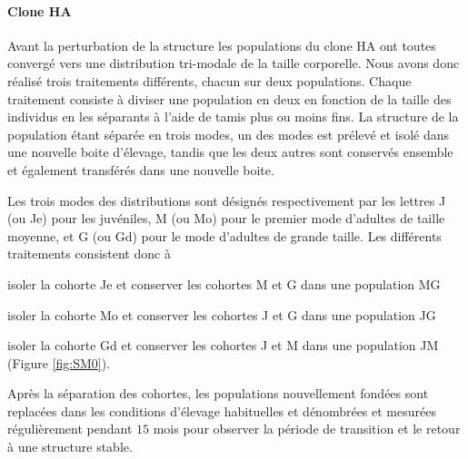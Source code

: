 \paragraph{Clone HA} Avant la perturbation de la structure les populations du
clone HA ont toutes convergé vers une distribution tri-modale de la taille
corporelle. Nous avons donc réalisé trois traitements différents, chacun sur
deux populations. Chaque traitement consiste à diviser une population en deux en
fonction de la taille des individus en les séparants à l'aide de tamis plus ou
moins fins.
La structure de la population étant séparée en trois modes, un des modes est
prélevé et isolé dans une nouvelle boite d'élevage, tandis que les deux autres
sont conservés ensemble et également transférés dans une nouvelle boite.

Les trois modes des distributions sont désignés respectivement par les lettres J
(ou Je) pour les juvéniles, M (ou Mo) pour le premier mode d'adultes de
taille moyenne, et G (ou Gd) pour le mode d'adultes de grande taille. Les
différents traitements consistent donc à \begin{enumerate*}[label=(\roman*), before=\unskip{ : }, itemjoin={{ ; }},
itemjoin*={{ ; et }}]
\item isoler la cohorte Je et conserver les cohortes M et G dans une population
MG
\item isoler la cohorte Mo et conserver les cohortes J et G dans une population
JG
\item isoler la cohorte Gd et conserver les cohortes J et M dans une population
JM (Figure \ref{fig:SM0}).
\end{enumerate*} 
Après la séparation des cohortes, les populations nouvellement fondées sont
replacées dans les conditions d'élevage habituelles et dénombrées et mesurées
régulièrement pendant $15$ mois pour observer la période de transition et le
retour à une structure stable. 

